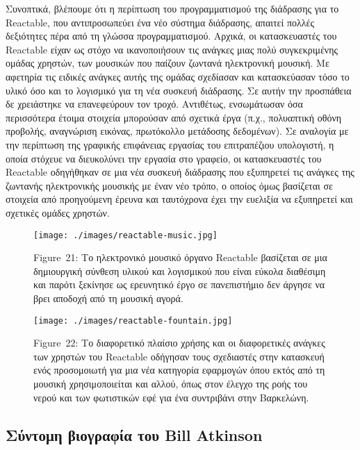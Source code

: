 \documentclass[
]{article}
\begin{document}
Συνοπτικά, βλέπουμε ότι η περίπτωση του προγραμματισμού της διάδρασης
για το Reactable, που αντιπροσωπεύει ένα νέο σύστημα διάδρασης, απαιτεί
πολλές δεξιότητες πέρα από τη γλώσσα προγραμματισμού. Αρχικά, οι
κατασκευαστές του Reactable είχαν ως στόχο να ικανοποιήσουν τις ανάγκες
μιας πολύ συγκεκριμένης ομάδας χρηστών, των μουσικών που παίζουν ζωντανά
ηλεκτρονική μουσική. Με αφετηρία τις ειδικές ανάγκες αυτής της ομάδας
σχεδίασαν και κατασκεύασαν τόσο το υλικό όσο και το λογισμικό για τη νέα
συσκευή διάδρασης. Σε αυτήν την προσπάθεια δε χρειάστηκε να επανεφεύρουν
τον τροχό. Αντιθέτως, ενσωμάτωσαν όσα περισσότερα έτοιμα στοιχεία
μπορούσαν από σχετικά έργα (π.χ., πολυαπτική οθόνη προβολής, αναγνώριση
εικόνας, πρωτόκολλο μετάδοσης δεδομένων). Σε αναλογία με την περίπτωση
της γραφικής επιφάνειας εργασίας του επιτραπέζιου υπολογιστή, η οποία
στόχευε να διευκολύνει την εργασία στο γραφείο, οι κατασκευαστές του
Reactable οδηγήθηκαν σε μια νέα συσκευή διάδρασης που εξυπηρετεί τις
ανάγκες της ζωντανής ηλεκτρονικής μουσικής με έναν νέο τρόπο, ο οποίος
όμως βασίζεται σε στοιχεία από προηγούμενη έρευνα και ταυτόχρονα έχει
την ευελιξία να εξυπηρετεί και σχετικές ομάδες χρηστών.

\leavevmode{}%
\begin{figure}
\hypertarget{fig:reactable-music}{%
\centering
\texttt{[image: ./images/reactable-music.jpg]}
\caption{Figure~21: Το ηλεκτρονικό μουσικό όργανο Reactable βασίζεται σε
μια δημιουργική σύνθεση υλικού και λογισμικού που είναι εύκολα διαθέσιμη
και παρότι ξεκίνησε ως ερευνητικό έργο σε πανεπιστήμιο δεν άργησε να
βρει αποδοχή από τη μουσική αγορά.}\label{fig:reactable-music}
}
\end{figure}

\leavevmode{}%
\begin{figure}
\hypertarget{fig:reactable-fountain}{%
\centering
\texttt{[image: ./images/reactable-fountain.jpg]}
\caption{Figure~22: Το διαφορετικό πλαίσιο χρήσης και οι διαφορετικές
ανάγκες των χρηστών του Reactable οδήγησαν τους σχεδιαστές στην
κατασκευή ενός προσομοιωτή για μια νέα κατηγορία εφαρμογών όπου εκτός
από τη μουσική χρησιμοποιείται και αλλού, όπως στον έλεγχο της ροής του
νερού και των φωτιστικών εφέ για ένα συντριβάνι στην
Βαρκελώνη.}\label{fig:reactable-fountain}
}
\end{figure}

\hypertarget{ux3c3ux3cdux3bdux3c4ux3bfux3bcux3b7-ux3b2ux3b9ux3bfux3b3ux3c1ux3b1ux3c6ux3afux3b1-ux3c4ux3bfux3c5-bill-atkinson}{%
\subsection{Σύντομη βιογραφία του Bill
Atkinson}\label{ux3c3ux3cdux3bdux3c4ux3bfux3bcux3b7-ux3b2ux3b9ux3bfux3b3ux3c1ux3b1ux3c6ux3afux3b1-ux3c4ux3bfux3c5-bill-atkinson}}
\end{document}
